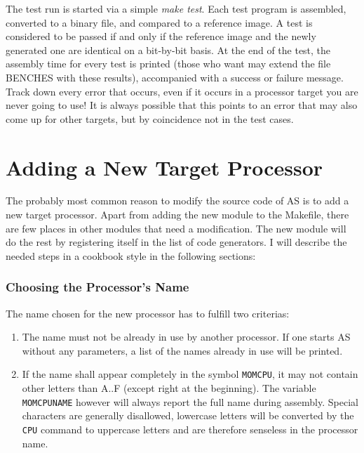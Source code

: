 \documentclass[12pt,twoside]{report}
\newcommand{\tty}[1]{{\tt #1}}
\begin{document}
The test run is started via a simple {\em make test}.  Each test program
is assembled, converted to a binary file, and compared to a reference
image.  A test is considered to be passed if and only if the reference
image and the newly generated one are identical on a bit-by-bit basis.  At
the end of the test, the assembly time for every test is printed (those
who want may extend the file BENCHES with these results), accompanied with
a success or failure message.  Track down every error that occurs, even if
it occurs in a processor target you are never going to use!  It is always
possible that this points to an error that may also come up for other
targets, but by coincidence not in the test cases.


\section{Adding a New Target Processor}

The probably most common reason to modify the source code of AS is to add
a new target processor.   Apart from adding the new module to the
Makefile, there are few places in other modules that need a modification.
The new module will do the rest by registering itself in the list of code
generators.  I will describe the needed steps in a cookbook style in the
following sections:

\subsubsection{Choosing the Processor's Name}

The name chosen for the new processor has to fulfill two criterias:
\begin{enumerate}
\item{The name must not be already in use by another processor.  If one
      starts AS without any parameters, a list of the names already in
      use will be printed.}
\item{If the name shall appear completely in the symbol \tty{MOMCPU}, it may
      not contain other letters than A..F (except right at the
      beginning).  The variable \tty{MOMCPUNAME} however will always report
      the full name during assembly.  Special characters are generally
      disallowed, lowercase letters will be converted by the \tty{CPU}
      command to uppercase letters and are therefore senseless in the
      processor name.}
\end{enumerate}
\end{document}
